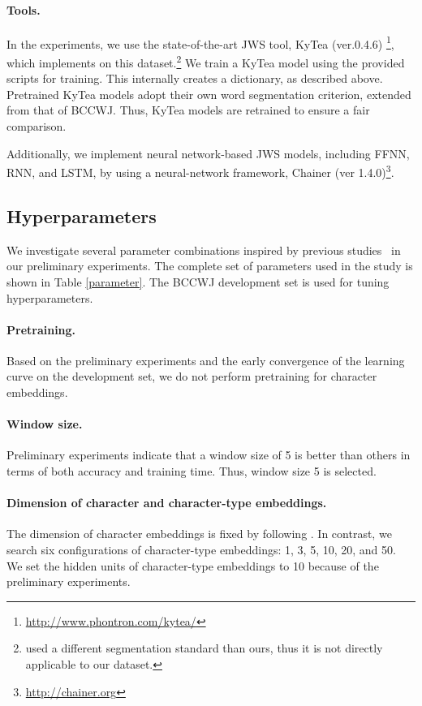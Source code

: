 \documentclass[11pt]{article}
\begin{document}
\paragraph{Tools.}
In the experiments, we use the state-of-the-art JWS tool, KyTea (ver.0.4.6)
\footnote{\url{http://www.phontron.com/kytea/}}, which implements
\cite{neubig-nakata-mori:2011:ACL-HLT2011} on this
dataset.\footnote{
used a different segmentation standard than ours, thus it is not directly
applicable to our dataset.}
We train a KyTea model using the provided scripts for training. This
internally creates a dictionary, as described above. Pretrained KyTea models
adopt their own word segmentation criterion, extended from that of BCCWJ.
Thus, KyTea models are retrained to ensure a fair comparison.

Additionally, we implement neural network-based JWS models, including FFNN,
RNN, and LSTM, by using a neural-network framework, Chainer (ver
1.4.0)\footnote{\url{http://chainer.org}}\cite{chainerlearningsys2015}.

\subsection{Hyperparameters}
We investigate several parameter combinations inspired by previous
studies~\cite{chen-EtAl:2015:EMNLP2} in our preliminary experiments. The
complete set of parameters used in the study is shown in Table
\ref{parameter}. The BCCWJ development set is used for tuning hyperparameters.

\paragraph{Pretraining.}
Based on the preliminary experiments and the early convergence of the learning
curve on the development set, we do not perform pretraining for character
embeddings.

\paragraph{Window size.} Preliminary experiments indicate that a window size
of 5 is better than others in terms of both accuracy and training time.
Thus, window size 5 is selected.

\paragraph{Dimension of character and character-type embeddings.}
The dimension of character embeddings is fixed by following \cite{chen-EtAl:2015:EMNLP2}.
In contrast, we search six configurations of character-type embeddings: 1, 3,
5, 10, 20, and 50. We set the hidden units of character-type embeddings to 10
because of the preliminary experiments.
\end{document}
